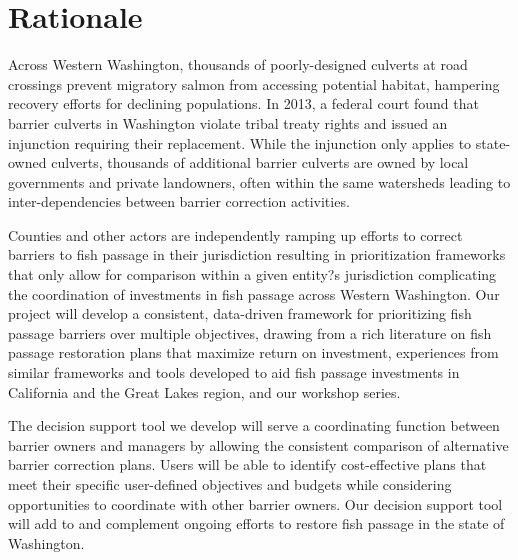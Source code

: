 \documentclass[12pt]{elsarticle}
\begin{document}
		\section{Rationale}
			Across Western Washington, thousands of poorly-designed culverts at road crossings prevent migratory salmon from accessing potential habitat, hampering recovery efforts for declining populations. In 2013, a federal court found that barrier culverts in Washington violate tribal treaty rights and issued an injunction requiring their replacement. While the injunction only applies to state-owned culverts, thousands of additional barrier culverts are owned by local governments and private landowners, often within the same watersheds leading to inter-dependencies between barrier correction activities. 
			
			Counties and other actors are independently ramping up efforts to correct barriers to fish passage in their jurisdiction resulting in prioritization frameworks that only allow for comparison within a given entity?s jurisdiction complicating the coordination of investments in fish passage across Western Washington. Our project will develop a consistent, data-driven framework for prioritizing fish passage barriers over multiple objectives, drawing from a rich literature on fish passage restoration plans that maximize return on investment, experiences from similar frameworks and tools developed to aid fish passage investments in California and the Great Lakes region, and our workshop series. 
			
			The decision support tool we develop will serve a coordinating function between barrier owners and managers by allowing the consistent comparison of alternative barrier correction plans. Users will be able to identify cost-effective plans that meet their specific user-defined objectives and budgets while considering opportunities to coordinate with other barrier owners. Our decision support tool will add to and complement ongoing efforts to restore fish passage in the state of Washington.

			
			
			
\end{document}
